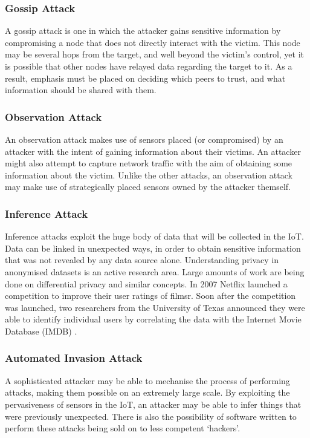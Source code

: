 \documentclass[10pt,journal,compsoc]{IEEEtran}
\begin{document}
\subsubsection{Gossip Attack}
A gossip attack is one in which the attacker gains sensitive information by
compromising a node that does not directly interact with the victim. This node
may be several hops from the target, and well beyond the victim's control, yet
it is possible that other nodes have relayed data regarding the target to it.
As a result, emphasis must be placed on deciding which peers to trust, and what
information should be shared with them.

\subsubsection{Observation Attack}
An observation attack makes use of sensors placed (or compromised) by an
attacker with the intent of gaining information about their victims. An
attacker might also attempt to capture network traffic with the aim of
obtaining some information about the victim. Unlike the other attacks, an
observation attack may make use of strategically placed sensors owned by the
attacker themself.

\subsubsection{Inference Attack}
Inference attacks exploit the huge body of data that will be collected in the
IoT. Data can be linked in unexpected ways, in order to obtain sensitive
information that was not revealed by any data source alone. Understanding
privacy in anonymised datasets is an active research area. Large amounts of
work are being done on differential privacy and similar concepts. In 2007
Netflix launched a competition to improve their user ratings of filmsr. Soon
after the competition was launched, two researchers from the University of
Texas announced they were able to identify individual users by correlating the
data with the Internet Movie Database (IMDB) \cite{Narayanan2008}.

\subsubsection{Automated Invasion Attack}
A sophisticated attacker may be able to mechanise the process of performing
attacks, making them possible on an extremely large scale. By exploiting the
pervasiveness of sensors in the IoT, an attacker may be able to infer things
that were previously unexpected. There is also the possibility of software
written to perform these attacks being sold on to less competent `hackers'. 
\end{document}
